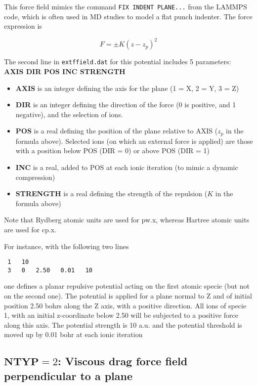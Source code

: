 \documentclass[a4paper,12pt,notitlepage]{article}
\begin{document}
This force field mimics the command \texttt{FIX INDENT PLANE...} from the LAMMPS code, which is often used in MD studies to model a flat punch indenter. The force expression is 

$$F = \pm K(z-z_p)^2$$

\noindent The second line in \texttt{extffield.dat} for this potential includes 5 parameters: \\ \textbf{AXIS  DIR  POS INC STRENGTH} 

\begin{itemize}
\item \textbf{AXIS} is an integer defining the axis for the plane (1 = X, 2 = Y, 3 = Z)
\item \textbf{DIR} is an integer defining the direction of the force (0 is positive, and 1 negative), and the selection of ions.
\item \textbf{POS} is a real defining the position of the plane relative to AXIS ($z_p$ in the formula above). Selected ions (on which an external force is applied) are those with a position below POS (DIR = 0) or above POS (DIR = 1)
\item \textbf{INC} is a real, added to POS at each ionic iteration (to mimic a dynamic compression)
\item \textbf{STRENGTH} is a real defining the strength of the repulsion ($K$ in the formula above)
\end{itemize}

\noindent Note that Rydberg atomic units are used for pw.x, whereas Hartree atomic units are used for cp.x. 
\medskip

\noindent For instance, with the following two lines
\begin{verbatim}
 1   10
 3   0   2.50   0.01   10
\end{verbatim}
one defines a planar repulsive potential acting on the first atomic specie (but not on the second one). The potential is applied for a plane normal to Z and of initial position 2.50 bohrs along the Z axis, with a positive direction. All ions of specie 1, with an initial z-coordinate below 2.50 will be subjected to a positive force along this axis. The potential strength is 10 a.u.  and the potential threshold is moved up by 0.01 bohr at each ionic iteration

\subsection{$\mathbf{NTYP} = 2$: Viscous drag force field perpendicular to a plane}
\end{document}
